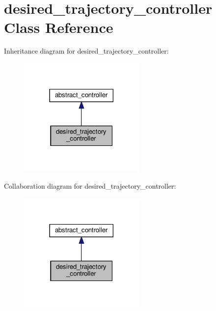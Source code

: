\hypertarget{classdesired__trajectory__controller}{}\section{desired\+\_\+trajectory\+\_\+controller Class Reference}
\label{classdesired__trajectory__controller}


Inheritance diagram for desired\+\_\+trajectory\+\_\+controller\+:\nopagebreak
\begin{figure}[H]
\begin{center}
\leavevmode
\includegraphics[width=177pt]{classdesired__trajectory__controller__inherit__graph}
\end{center}
\end{figure}


Collaboration diagram for desired\+\_\+trajectory\+\_\+controller\+:\nopagebreak
\begin{figure}[H]
\begin{center}
\leavevmode
\includegraphics[width=177pt]{classdesired__trajectory__controller__coll__graph}
\end{center}
\end{figure}
